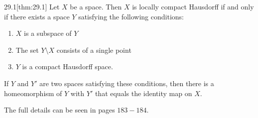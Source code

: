 \begin{thmBox}{29.1}[thm:29.1]
    Let \( X \) be a space. 
    Then \( X \) is locally compact Hausdorff if and only if there exists a 
    space \( Y \) satisfying the following conditions:

    \begin{enumerate}
        \item \( X \) is a subspace of \( Y \)
        \item The set \( Y \setminus X \) consists of a single point
        \item \( Y \) is a compact Hausdorff space.
    \end{enumerate}

    If \( Y \) and \( Y' \) are two spaces satisfying these conditions, then 
    there is a homeomorphism of \( Y \) with \( Y' \) that equals the identity
    map on \( X \).

    \baseRule

    \begin{proofBox}
        The full details can be seen in pages \( 183-184 \).
    \end{proofBox}
\end{thmBox}

